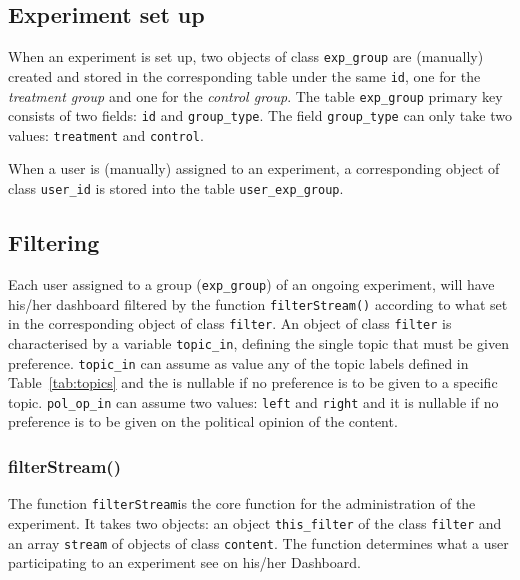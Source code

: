 \documentclass[a4paper]{article}
\begin{document}
  \subsection{Experiment set up}

When an experiment is set up, two objects of class \verb|exp_group| are (manually) created and stored in the corresponding table under the same \verb|id|, one for the \textit{treatment group} and one for the \textit{control group}. The table \verb|exp_group| primary key consists of two fields: \verb|id| and \verb|group_type|. The field \verb|group_type| can only take two values: \verb|treatment| and \verb|control|. 

When a user is (manually) assigned to an experiment, a corresponding object of class \verb|user_id| is stored into the table \verb|user_exp_group|.


\subsection{Filtering}\label{sec:filtering}

Each user assigned to a group (\verb|exp_group|) of an ongoing experiment, will have his/her dashboard filtered by the function \verb|filterStream()| according to what set in the corresponding object of class \verb|filter|. An object of class \verb|filter| is characterised by a variable \verb|topic_in|, defining the single topic that must be given preference. \verb|topic_in| can assume as value any of the topic labels defined in Table~\ref{tab:topics} and the is nullable if no preference is to be given to a specific topic. \verb|pol_op_in| can assume two values: \verb|left| and \verb|right| and it is nullable if no preference is to be given on the political opinion of the content.

\subsubsection{filterStream()}

The function \verb|filterStream|is the core function for the administration of the experiment. It takes two objects: an object \verb|this_filter| of the class \verb|filter| and an array \verb|stream| of objects of class \verb|content|. The function determines what a user participating to an experiment see on his/her Dashboard.
\end{document}
